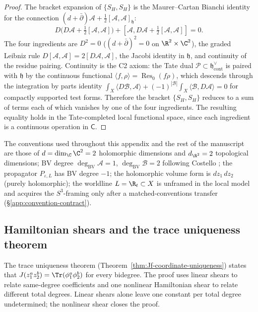 \begin{proof}
The bracket expansion of \(\{S_H,S_H\}\) is the Maurer--Cartan
Bianchi identity for the connection \((d+\bar\partial)\mathcal A
+\tfrac12[\mathcal A,\mathcal A]_{\mathfrak h}\):
\[
  D\bigl(D\mathcal A+\tfrac12[\mathcal A,\mathcal A]\bigr)
  +[\mathcal A,D\mathcal A+\tfrac12[\mathcal A,\mathcal A]]
  =0.
\]
The four ingredients are \(D^2=0\)
(\((d+\bar\partial)^2=0\) on \(\R^2\times\C^2\)), the graded Leibniz
rule \(D[\mathcal A,\mathcal A]=2[D\mathcal A,\mathcal A]\), the
Jacobi identity in \(\mathfrak h\), and continuity of the residue
pairing.  Continuity is the C2 axiom: the Tate dual
\(\mathcal P\subset\mathfrak h^\vee_{\mathrm{cont}}\) is paired with
\(\mathfrak h\) by the continuous functional
\(\langle f,\rho\rangle=\operatorname{Res}_0(f\rho)\), which descends
through the integration by parts identity
\(\int_X\langle D\mathcal B,\mathcal A\rangle
+(-1)^{|\mathcal B|}\int_X\langle\mathcal B,D\mathcal A\rangle=0\)
for compactly supported test forms.  Therefore the bracket
\(\{S_H,S_H\}\) reduces to a sum of terms each of which vanishes by
one of the four ingredients.  The resulting equality holds in the
Tate-completed local functional space, since each ingredient is a
continuous operation in \(\mathsf C\).
\end{proof}

\begin{rmk}
\label{rmk:completion-bv-conventions}
The conventions used throughout this appendix and the rest of the
manuscript are those of \(d=\dim_\C\C^2=2\) holomorphic dimensions and
\(d_{\R^2}=2\) topological dimensions; BV degree
\(\deg_{\mathrm{BV}}\mathcal A=1\), \(\deg_{\mathrm{BV}}\mathcal B=2\)
following Costello \cite{costello-renormalization}; the propagator
\(P_{\varepsilon,L}\) has BV degree \(-1\); the holomorphic volume
form is \(dz_1\,dz_2\) (purely holomorphic); the worldline
\(L=\R_t\subset X\) is unframed in the local model and acquires the
\(S^3\)-framing only after a matched-conventions transfer
(\S\ref{app:convention-contract}).
\end{rmk}

\subsection{Hamiltonian shears and the trace uniqueness theorem}
\label{ssec:completion-trace-uniqueness}

The trace uniqueness theorem (Theorem~\ref{thm:Jf-coordinate-uniqueness})
states that \(J(z_1^az_2^b)=\Tr(\phi_1^a\phi_2^b)\) for every
bidegree.  The proof uses linear shears to relate same-degree
coefficients and one nonlinear Hamiltonian shear to relate different
total degrees.  Linear shears alone leave one constant per total
degree undetermined; the nonlinear shear closes the proof.

